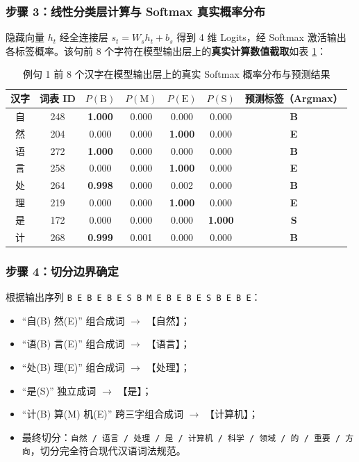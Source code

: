 \documentclass[11pt,a4paper]{ctexart}
\begin{document}
\subsubsection{步骤 3：线性分类层计算与 Softmax 真实概率分布}

隐藏向量 $h_t$ 经全连接层 $s_t = W_s h_t + b_s$ 得到 4 维 Logits，经 Softmax 激活输出各标签概率。该句前 8 个字符在模型输出层上的\textbf{真实计算数值截取}如表 \ref{tab:prob_demo}：

\begin{table}[H]
    \centering
    \small
    \caption{例句 1 前 8 个汉字在模型输出层上的真实 Softmax 概率分布与预测结果}
    \label{tab:prob_demo}
    \begin{tabular}{ccccccc}
        \toprule
        \textbf{汉字} & \textbf{词表 ID} & \textbf{$P(\text{B})$} & \textbf{$P(\text{M})$} & \textbf{$P(\text{E})$} & \textbf{$P(\text{S})$} & \textbf{预测标签（Argmax）} \\
        \midrule
        自 & 248 & \textbf{1.000} & 0.000 & 0.000 & 0.000 & \textbf{B} \\
        然 & 204 & 0.000 & 0.000 & \textbf{1.000} & 0.000 & \textbf{E} \\
        语 & 272 & \textbf{1.000} & 0.000 & 0.000 & 0.000 & \textbf{B} \\
        言 & 258 & 0.000 & 0.000 & \textbf{1.000} & 0.000 & \textbf{E} \\
        处 & 264 & \textbf{0.998} & 0.000 & 0.002 & 0.000 & \textbf{B} \\
        理 & 219 & 0.000 & 0.000 & \textbf{1.000} & 0.000 & \textbf{E} \\
        是 & 172 & 0.000 & 0.000 & 0.000 & \textbf{1.000} & \textbf{S} \\
        计 & 268 & \textbf{0.999} & 0.001 & 0.000 & 0.000 & \textbf{B} \\
        \bottomrule
    \end{tabular}
\end{table}

\subsubsection{步骤 4：切分边界确定}

根据输出序列 \texttt{B E B E B E S B M E B E B E S B E B E}：
\begin{itemize}
    \setlength{\itemsep}{0pt}
    \item “自(B) 然(E)” 组合成词 $\to$ 【自然】；
    \item “语(B) 言(E)” 组合成词 $\to$ 【语言】；
    \item “处(B) 理(E)” 组合成词 $\to$ 【处理】；
    \item “是(S)” 独立成词 $\to$ 【是】；
    \item “计(B) 算(M) 机(E)” 跨三字组合成词 $\to$ 【计算机】；
    \item 最终切分：\texttt{自然 / 语言 / 处理 / 是 / 计算机 / 科学 / 领域 / 的 / 重要 / 方向}，切分完全符合现代汉语词法规范。
\end{itemize}
\end{document}
